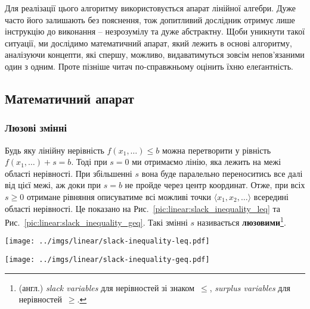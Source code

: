 \documentclass[\main/book.tex]{subfiles}
\begin{document}
Для реалізації цього алгоритму використовується апарат лінійної алгебри. Дуже часто його залишають без пояснення, тож допитливий дослідник отримує лише інструкцію до виконання -- незрозумілу та дуже абстрактну. Щоби уникнути такої ситуації, ми дослідимо математичний апарат, який лежить в основі алгоритму, аналізуючи концепти, які спершу, можливо, видаватимуться зовсім непов'язаними один з одним. Проте пізніше читач по-справжньому оцінить їхню елеґантність.

\subsection{Математичний апарат}

\subsubsection{Люзові змінні}

Будь яку лінійну нерівність $f(x_1, \ldots) \leq b$ можна перетворити у рівність $f(x_1, \ldots) + s = b$. Тоді при ${s=0}$ ми отримаємо лінію, яка лежить на межі області нерівності. При збільшенні $s$ вона буде паралельно переноситись все далі від цієї межі, аж доки при $s=b$ не пройде через центр координат. Отже, при всіх $s \geq 0$ отримане рівняння описуватиме всі можливі точки $\langle x_1, x_2, \ldots \rangle$ всередині області нерівності. Це показано на Рис.~\ref{pic:linear:slack_inequality_leq} та Рис.~\ref{pic:linear:slack_inequality_geq}. Такі змінні $s$ називається \textbf{люзовими}\footnote{(англ.) \textit{slack variables} для нерівностей зі знаком~\flqq{}$\leq$\frqq{}, \textit{surplus variables} для нерівностей~\flqq{}$\geq$\frqq{}.}.

\begin{figure*}
 \centering
 \begin{minipage}[t]{.47\textwidth}
  \texttt{[image: ../imgs/linear/slack-inequality-leq.pdf]}
  \caption{Нерівність $x_1 + x_2 \leq 4$ утворює область, межу якої можна описати рівнянням $x_1 + x_2 + s = 4$ при $s=0$. При $s=b=4$ ця лі\-нія проходить через центр координат.}
  \label{pic:linear:slack_inequality_leq}
 \end{minipage}\qquad
 \begin{minipage}[t]{.47\textwidth}
  \texttt{[image: ../imgs/linear/slack-inequality-geq.pdf]}
  \caption{Для того, щоби отримати такий самий ефект для нерівностей \flqq{}$\geq$\frqq{}, змінну $s$ потрібно включити у рівняння прямої зі знаком~\flqq{}$-$\frqq{}.}
  \label{pic:linear:slack_inequality_geq}
 \end{minipage}
\end{figure*}
\end{document}
